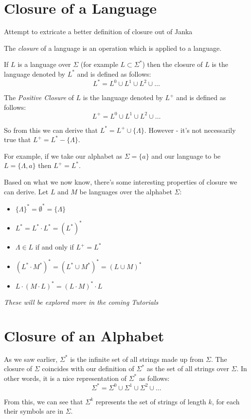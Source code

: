 \section{Closure of a Language}
\begin{todo}
Attempt to extricate a better definition of closure out of Janka
\end{todo}

The \textit{closure} of a language is an operation which is applied to a language. 

If $L$ is a language over $\Sigma$ (for example $L \subset \Sigma^*$) then the closure of $L$ is the language denoted by $L^*$ and is defined as follows:
\[L^* = L^0 \cup L^1 \cup L^2 \cup \ldots\]

The \textit{Positive Closure} of $L$ is the language denoted by $L^+$ and is defined as follows:
\[L^+ = L^0 \cup L^1 \cup L^2 \cup \ldots\]

So from this we can derive that $L^* = L^+ \cup \{\Lambda\}$. However - it's not necessarily true that $L^+ = L^* - \{\Lambda\}$. 

For example, if we take our alphabet as $\Sigma = \{a\}$ and our language to be $L = \{\Lambda, a\}$ then $L^+ = L^*$. 

Based on what we now know, there's some interesting properties of closure we can derive. Let $L$ and $M$ be languages over the alphabet $\Sigma$:
\begin{itemize}
    \item $\{\Lambda\}^* = \emptyset^* = \{\Lambda\}$
    \item $L^* = L^* \cdot L^* = (L^*)^*$
    \item $\Lambda \in L$ if and only if $L^+ = L^*$
    \item $(L^* \cdot M^*)^* = (L^* \cup M^*)^* = (L \cup M)^*$
    \item $L \cdot (M \cdot L)^* = (L \cdot M)^* \cdot L$
\end{itemize}

\textit{These will be explored more in the coming Tutorials}

\section{Closure of an Alphabet}
As we saw earlier, $\Sigma^*$ is the infinite set of all strings made up from $\Sigma$. The closure of $\Sigma$ coincides with our definition of $\Sigma^*$ as the set of all strings over $\Sigma$. In other words, it is a nice representation of $\Sigma^*$ as follows:
\[\Sigma^* = \Sigma^0 \cup \Sigma^1 \cup \Sigma^2 \cup \ldots\]

From this, we can see that $\Sigma^k$ represents the set of strings of length $k$, for each their symbols are in $\Sigma$. 